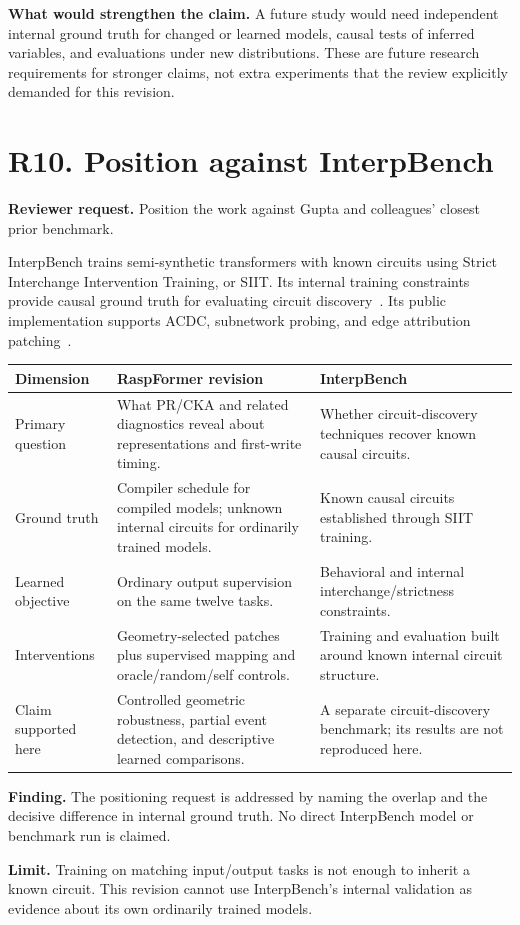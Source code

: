 \documentclass[10pt,a4paper]{article}
\newcommand{\newsection}[1]{\clearpage\section{#1}}
\newcommand{\request}[1]{\begingroup\color{muted}\textbf{Reviewer request.} #1\par\endgroup}
\newcommand{\finding}[1]{\par\begingroup\color{teal}\textbf{Finding.} #1\par\endgroup}
\newcommand{\limit}[1]{\par\textbf{Limit.} #1\par}
\begin{document}
\textbf{What would strengthen the claim.} A future study would need independent internal ground truth for changed or learned models, causal tests of inferred variables, and evaluations under new distributions. These are future research requirements for stronger claims, not extra experiments that the review explicitly demanded for this revision.

\newsection{R10. Position against InterpBench}
\request{Position the work against Gupta and colleagues' closest prior benchmark.}
InterpBench trains semi-synthetic transformers with known circuits using Strict Interchange Intervention Training, or SIIT. Its internal training constraints provide causal ground truth for evaluating circuit discovery~\cite{interpbench}. Its public implementation supports ACDC, subnetwork probing, and edge attribution patching~\cite{interpbenchcode}.

\begin{center}\small
\begin{tabularx}{\linewidth}{@{}P{.21\linewidth}XX@{}}
\toprule
Dimension & RaspFormer revision & InterpBench\\
\midrule
Primary question & What PR/CKA and related diagnostics reveal about representations and first-write timing. & Whether circuit-discovery techniques recover known causal circuits.\\
Ground truth & Compiler schedule for compiled models; unknown internal circuits for ordinarily trained models. & Known causal circuits established through SIIT training.\\
Learned objective & Ordinary output supervision on the same twelve tasks. & Behavioral and internal interchange/strictness constraints.\\
Interventions & Geometry-selected patches plus supervised mapping and oracle/random/self controls. & Training and evaluation built around known internal circuit structure.\\
Claim supported here & Controlled geometric robustness, partial event detection, and descriptive learned comparisons. & A separate circuit-discovery benchmark; its results are not reproduced here.\\
\bottomrule
\end{tabularx}
\end{center}

\finding{The positioning request is addressed by naming the overlap and the decisive difference in internal ground truth. No direct InterpBench model or benchmark run is claimed.}
\limit{Training on matching input/output tasks is not enough to inherit a known circuit. This revision cannot use InterpBench's internal validation as evidence about its own ordinarily trained models.}
\end{document}
